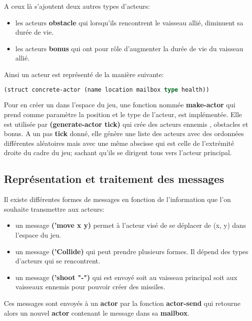 A ceux là s'ajoutent deux autres types d'acteurs:
\\

\begin{itemize}
    \item les acteurs \textbf{obstacle} qui lorsqu'ils rencontrent le vaisseau allié, diminuent sa durée de vie.
    \item les acteurs \textbf{bonus} qui ont pour rôle d'augmenter la durée de vie du vaisseau allié.
\end{itemize}

Ainsi un acteur est représenté de la manière suivante: 

\begin{lstlisting}[language={lisp},captionpos=b, frame=single]
(struct concrete-actor (name location mailbox type health))
\end{lstlisting}

Pour en créer un dans l'espace du jeu, une fonction nommée \textbf{make-actor} qui prend comme paramètre la position et le type de l'acteur, est implémentée. Elle est utilisée par \textbf{(generate-actor tick)} qui crée des acteurs ennemis , obstacles et bonus. A un pas \textbf{tick} donné, elle génère une liste des acteurs avec des ordonnées différentes aléatoires mais avec une même abscisse qui est celle de l'extrémité droite du cadre du jeu; sachant qu'ils se dirigent tous vers l'acteur principal.

\subsection{Représentation et traitement des messages}

Il existe différentes formes de messages en fonction de l'information que l'on souhaite transmettre aux acteurs:
\begin{itemize}
    \item un message \textbf{('move x y)} permet à l'acteur visé de se déplacer de (x, y) dans l'espace du jeu.
    \item un message \textbf{('Collide)} qui peut prendre plusieurs formes. Il dépend des types d'acteurs qui se rencontrent.
    \item un message \textbf{('shoot "-")} qui est envoyé soit au vaisseau principal soit aux vaisseaux ennemis pour pouvoir créer des missiles. 
\end{itemize}

Ces messages sont envoyés à un \textbf{actor} par la fonction \textbf{actor-send} qui retourne alors un nouvel \textbf{actor} contenant le message dans sa \textbf{mailbox}.

